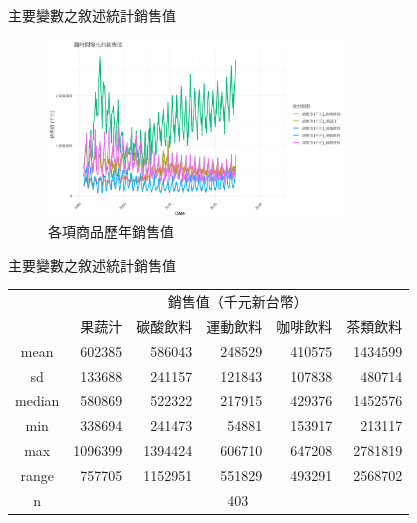 \documentclass[12pt]{beamer}
\begin{document}
\begin{frame}{主要變數之敘述統計}{銷售值}
	\begin{figure}
		\centering
		\includegraphics[width=0.7\textwidth]{figures/銷售值.jpg}
		\caption{各項商品歷年銷售值}
	\end{figure}
\end{frame}

\begin{frame}{主要變數之敘述統計}{銷售值}
	\begin{center}
	 \begin{tabular}{ c r r r r r} 
	  \hline
	  & \multicolumn{5}{c}{銷售值（千元新台幣）} \\
	  & 果蔬汁 & 碳酸飲料 & 運動飲料 & 咖啡飲料 & 茶類飲料 \\ 
	  \hline
	  mean & 602385 & 586043 & 248529 & 410575 & 1434599 \\ 
	  sd & 133688 & 241157 & 121843 & 107838 & 480714 \\
	  median & 580869 & 522322 & 217915 & 429376 & 1452576 \\ 
	  min & 338694 & 241473 & 54881 & 153917 & 213117  \\ 
	  max & 1096399 & 1394424 & 606710 & 647208 & 2781819 \\ 
	  range & 757705 & 1152951 & 551829 & 493291 & 2568702 \\ 
	  n & \multicolumn{5}{c}{403} \\
	  \hline
	 \end{tabular}
	\end{center}
\end{frame}
\end{document}

